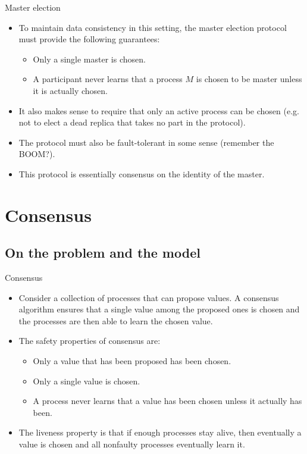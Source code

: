 \documentclass{beamer}
\begin{document}
\begin{frame}{Master election}
  \begin{itemize}
    \item  To maintain data consistency in this setting, the master election protocol \alert{must} provide the following guarantees:
      \begin{itemize}
        \item Only a single master is chosen.
        \item A participant never learns that a process $M$ is chosen to be master unless it is actually chosen.
      \end{itemize}
    \item It also makes sense to require that only an active process can be chosen (e.g. not to elect a dead replica that takes no part in the protocol).
    \item The protocol must also be fault-tolerant in some sense (remember the BOOM?).
    \item This protocol is essentially \alert{consensus} on the identity of the master.
  \end{itemize}
\end{frame}

\section{Consensus}
\subsection{On the problem and the model}
\begin{frame}{Consensus}
  \begin{itemize}
    \item Consider a collection of processes that can propose values. A \alert{consensus} algorithm ensures that a single value among the proposed ones is chosen and the processes are then able to learn the chosen value.
    \item The \alert{safety} properties of consensus are:
      \begin{itemize}
        \item Only a value that has been proposed has been chosen.
        \item Only a single value is chosen.
        \item A process never learns that a value has been chosen unless it actually has been.
      \end{itemize}
    \item The \alert{liveness} property is that if enough processes stay alive, then eventually a value is chosen and all nonfaulty processes eventually learn it.
  \end{itemize}
\end{frame}
\end{document}
